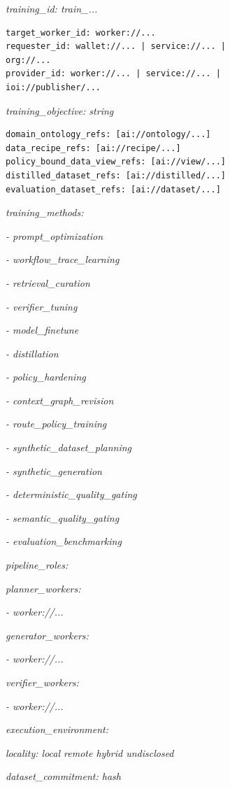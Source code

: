 \documentclass[
  11pt,
]{article}
\begin{document}
\emph{training\_id: train\_...}

\begin{lstlisting}[language={},basicstyle=\ttfamily\scriptsize]
target_worker_id: worker://...
requester_id: wallet://... | service://... |
org://...
provider_id: worker://... | service://... |
ioi://publisher/...
\end{lstlisting}
\emph{training\_objective: string}

\begin{lstlisting}[language={},basicstyle=\ttfamily\scriptsize]
domain_ontology_refs: [ai://ontology/...]
data_recipe_refs: [ai://recipe/...]
policy_bound_data_view_refs: [ai://view/...]
distilled_dataset_refs: [ai://distilled/...]
evaluation_dataset_refs: [ai://dataset/...]
\end{lstlisting}
\emph{training\_methods:}

\emph{- prompt\_optimization}

\emph{- workflow\_trace\_learning}

\emph{- retrieval\_curation}

\emph{- verifier\_tuning}

\emph{- model\_finetune}

\emph{- distillation}

\emph{- policy\_hardening}

\emph{- context\_graph\_revision}

\emph{- route\_policy\_training}

\emph{- synthetic\_dataset\_planning}

\emph{- synthetic\_generation}

\emph{- deterministic\_quality\_gating}

\emph{- semantic\_quality\_gating}

\emph{- evaluation\_benchmarking}

\emph{pipeline\_roles:}

\emph{planner\_workers:}

\emph{- worker://...}

\emph{generator\_workers:}

\emph{- worker://...}

\emph{verifier\_workers:}

\emph{- worker://...}

\emph{execution\_environment:}

\emph{locality: local \textbar{} remote \textbar{} hybrid \textbar{}
undisclosed}

\emph{dataset\_commitment: hash}
\end{document}
